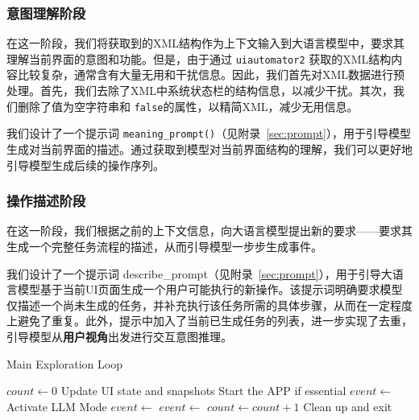\documentclass[twocolumn, 10pt]{article}
\begin{document}
\subsubsection{意图理解阶段}
\label{sec:intent}

在这一阶段，我们将获取到的XML结构作为上下文输入到大语言模型中，要求其理解当前界面的意图和功能。但是，由于通过 \texttt{uiautomator2} 获取的XML结构内容比较复杂，通常含有大量无用和干扰信息。因此，我们首先对XML数据进行预处理。首先，我们去除了XML中系统状态栏的结构信息，以减少干扰。其次，我们删除了值为空字符串和 \texttt{false}的属性，以精简XML，减少无用信息。

我们设计了一个提示词 \texttt{meaning\_prompt()}（见附录~\ref{sec:prompt}），用于引导模型生成对当前界面的描述。通过获取到模型对当前界面结构的理解，我们可以更好地引导模型生成后续的操作序列。

\subsubsection{操作描述阶段}
\label{sec:action}

在这一阶段，我们根据之前的上下文信息，向大语言模型提出新的要求——要求其生成一个完整任务流程的描述，从而引导模型一步步生成事件。

我们设计了一个提示词 describe\_prompt（见附录~\ref{sec:prompt}），用于引导大语言模型基于当前UI页面生成一个用户可能执行的新操作。该提示词明确要求模型仅描述一个尚未生成的任务，并补充执行该任务所需的具体步骤，从而在一定程度上避免了重复。此外，提示中加入了当前已生成任务的列表，进一步实现了去重，引导模型从\textbf{用户视角}出发进行交互意图推理。

\begin{algorithm}[t]
\caption{Main Exploration Loop}
\label{alg:main}
\begin{algorithmic}[1]
  \State $count \gets 0$
    \State Update UI state and snapshots
    \State Start the APP if essential
        \State $event \gets$ 
        \State Activate LLM Mode
        \State $event \gets$ 
    \Else
        \State $event \gets$ 
    \EndIf
    \State {}
    \State $count \gets count + 1$
  \EndWhile
  \State Clean up and exit
\EndFunction
\end{algorithmic}
\end{algorithm}
\end{document}
